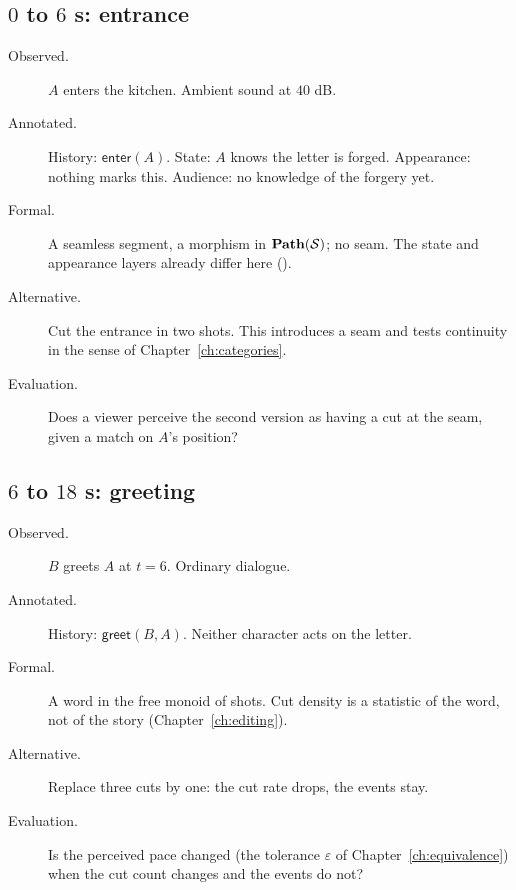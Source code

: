 \subsection*{$0$ to $6$ s: entrance}
\begin{description}
\item[Observed.] $A$ enters the kitchen. Ambient sound at $40$ dB.
\item[Annotated.] History: $\mathsf{enter}(A)$. State: $A$ knows the letter is forged. Appearance: nothing marks this. Audience: no knowledge of the forgery yet.
\item[Formal.] A seamless segment, a morphism in $\mathbf{Path}(\mathcal{S})$; no seam. The state and appearance layers already differ here ().
\item[Alternative.] Cut the entrance in two shots. This introduces a seam and tests continuity in the sense of Chapter~\ref{ch:categories}.
\item[Evaluation.] Does a viewer perceive the second version as having a cut at the seam, given a match on $A$'s position?
\end{description}

\subsection*{$6$ to $18$ s: greeting}
\begin{description}
\item[Observed.] $B$ greets $A$ at $t=6$. Ordinary dialogue.
\item[Annotated.] History: $\mathsf{greet}(B,A)$. Neither character acts on the letter.
\item[Formal.] A word in the free monoid of shots. Cut density is a statistic of the word, not of the story (Chapter~\ref{ch:editing}).
\item[Alternative.] Replace three cuts by one: the cut rate drops, the events stay.
\item[Evaluation.] Is the perceived pace changed (the tolerance $\varepsilon$ of Chapter~\ref{ch:equivalence}) when the cut count changes and the events do not?
\end{description}

